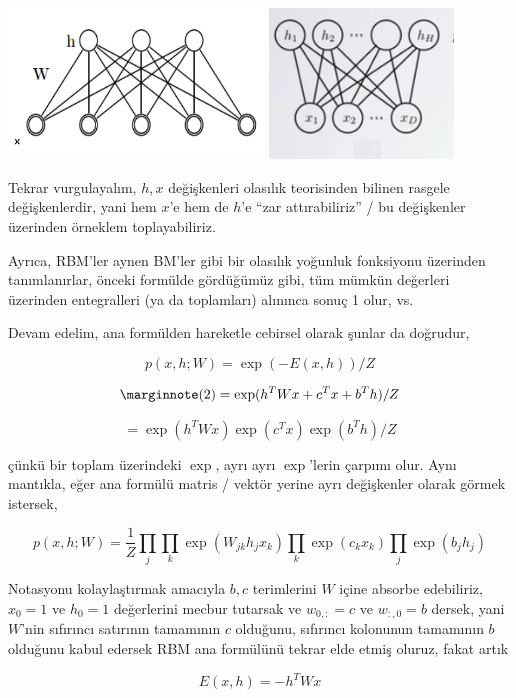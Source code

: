 \documentclass[12pt,fleqn]{article}\usepackage{../../common}
\begin{document}
\includegraphics[height=4cm]{rbm_01.png}
\includegraphics[height=4cm]{rbm_02.png}

Tekrar vurgulayalım, $h,x$ değişkenleri olasılık teorisinden bilinen
rasgele değişkenlerdir, yani hem $x$'e hem de $h$'e ``zar attırabiliriz'' /
bu değişkenler üzerinden örneklem toplayabiliriz.

Ayrıca, RBM'ler aynen BM'ler gibi bir olasılık yoğunluk fonksiyonu
üzerinden tanımlanırlar, önceki formülde gördüğümüz gibi, tüm mümkün
değerleri üzerinden entegralleri (ya da toplamları) alınınca sonuç 1 olur,
vs.

Devam edelim, ana formülden hareketle cebirsel olarak şunlar da doğrudur,

$$ p(x,h;W) = \exp (-E(x,h)) / Z $$

$$ 
\mlabel{2}
= \exp (h^TWx + c^Tx + b^Th ) / Z $$

$$ = \exp (h^TWx) \exp (c^Tx) \exp(b^Th) / Z $$

çünkü bir toplam üzerindeki $\exp$, ayrı ayrı $\exp$'lerin çarpımı
olur. Aynı mantıkla, eğer ana formülü matris / vektör yerine ayrı
değişkenler olarak görmek istersek,

$$ 
p(x,h;W) = \frac{1}{Z}
\prod_j \prod_k \exp (W_{jk}h_jx_k) \prod_k \exp(c_kx_k) \prod_j \exp(b_jh_j) 
 $$

Notasyonu kolaylaştırmak amacıyla $b,c$ terimlerini $W$ içine absorbe
edebiliriz, $x_0=1$ ve $h_0=1$ değerlerini mecbur tutarsak ve $w_{0,:}=c$
ve $w_{:,0}=b$ dersek, yani $W$'nin sıfırıncı satırının tamamının $c$
olduğunu, sıfırıncı kolonunun tamamının $b$ olduğunu kabul edersek
RBM ana formülünü tekrar elde etmiş oluruz, fakat artık

$$ E(x,h) = -h^TWx $$
\end{document}
